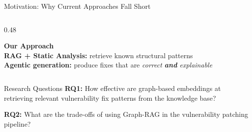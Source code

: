 \documentclass[aspectratio=169,10pt]{beamer}
\begin{document}
\begin{frame}{Motivation: Why Current Approaches Fall Short}
\begin{columns}[T]
\begin{column}{0.48\textwidth}
    \vspace{0.6em}
    \vspace{0.4em}

    \textbf{Our Approach}\\[0.3em]
    \textbf{RAG + Static Analysis:} retrieve known structural patterns\\
     
    \textbf{Agentic generation:} produce fixes that are \emph{correct \textbf{and} explainable}
  \end{column}

\end{columns}

\end{frame}
\begin{frame}{Research Questions}
  \textbf{RQ1: }How effective are graph-based embeddings at retrieving relevant vulnerability fix patterns from the knowledge base?
 
    \vspace{0.5cm}
\textbf{RQ2: }What are the trade-offs of using Graph-RAG in the vulnerability patching pipeline?

\end{frame}
\end{document}
